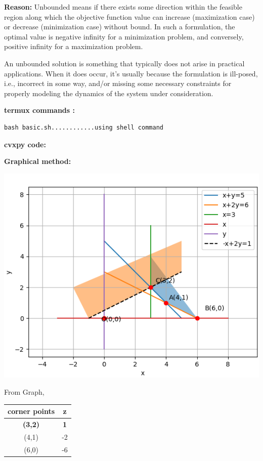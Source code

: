 \documentclass[10pt, a4paper]{article}
\begin{document}
\textbf{Reason:}
Unbounded means  if there exists some direction within the feasible region along which the objective function value can increase (maximization case) or decrease (minimization case) without bound. In such a formulation, the optimal value is negative infinity for a minimization problem, and conversely, positive infinity for a maximization problem.

An unbounded solution is something that typically does not arise in practical applications. When it does occur, it’s usually because the formulation is ill-posed, i.e., incorrect in some way, and/or missing some necessary constraints for properly modeling the dynamics of the system under consideration.

\vspace{20cm}
\textbf{termux commands :}
\begin{lstlisting}
bash basic.sh............using shell command
\end{lstlisting}

\textbf{cvxpy code:}
\begin{center}
\end{center}

\textbf{Graphical method:}
\begin{center}
   {\includegraphics[scale=0.5]{image.png}}  
\end{center}
From Graph,
\begin{center}
\begin{tabular}{|c|c|}
	\hline
	corner points&z\\
	\hline
	\textbf{(3,2)}&\textbf{1}\\
	\hline
    (4,1)&-2\\
    \hline
    (6,0)&-6\\
	\hline
\end{tabular}
\end{center}
\end{document}
